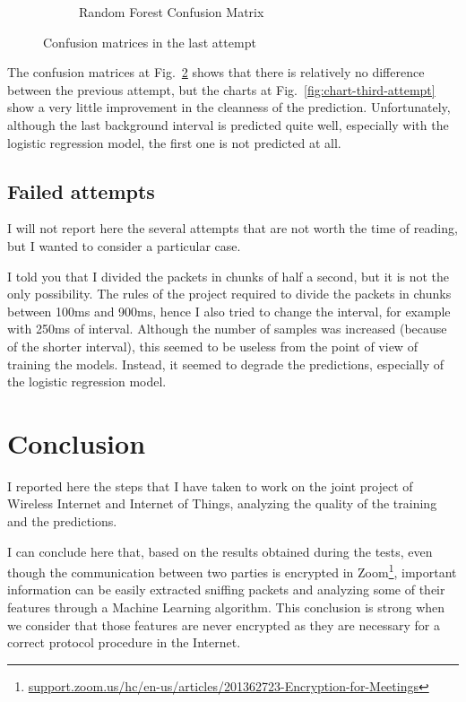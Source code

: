 \documentclass[12pt, conference]{IEEEtran}
\begin{document}
\begin{figure}[t]
\begin{subfigure}[b]{.5\linewidth}
        \caption{Random Forest Confusion Matrix}
        \label{fig:confusion-matrix-last-attempt-logreg}
    \end{subfigure}
    \caption{Confusion matrices in the last attempt}
    \label{fig:confusion-matrix-last-attempt}
\end{figure}

The confusion matrices at Fig.~\ref{fig:confusion-matrix-last-attempt} shows that there is relatively no difference between the previous attempt, but the charts at Fig.~\ref{fig:chart-third-attempt} show a very little improvement in the cleanness of the prediction. Unfortunately, although the last background interval is predicted quite well, especially with the logistic regression model, the first one is not predicted at all.

\subsection{Failed attempts}

I will not report here the several attempts that are not worth the time of reading, but I wanted to consider a particular case.

I told you that I divided the packets in chunks of half a second, but it is not the only possibility. The rules of the project required to divide the packets in chunks between 100ms and 900ms, hence I also tried to change the interval, for example with 250ms of interval. Although the number of samples was increased (because of the shorter interval), this seemed to be useless from the point of view of training the models. Instead, it seemed to degrade the predictions, especially of the logistic regression model.

\section{Conclusion}

I reported here the steps that I have taken to work on the joint project of Wireless Internet and Internet of Things, analyzing the quality of the training and the predictions.

I can conclude here that, based on the results obtained during the tests, even though the communication between two parties is encrypted in Zoom\footnote{\href{https://support.zoom.us/hc/en-us/articles/201362723-Encryption-for-Meetings}{support.zoom.us/hc/en-us/articles/201362723-Encryption-for-Meetings}}, important information can be easily extracted sniffing packets and analyzing some of their features through a Machine Learning algorithm. This conclusion is strong when we consider that those features are never encrypted as they are necessary for a correct protocol procedure in the Internet.
\end{document}
